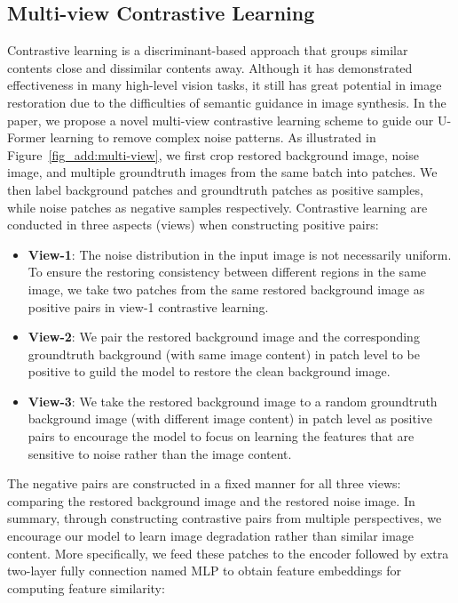 \subsection{Multi-view Contrastive Learning}
Contrastive learning is a discriminant-based approach that groups similar contents close and dissimilar contents away. Although it has demonstrated effectiveness in many high-level vision tasks, it still has great potential in image restoration due to the difficulties of semantic guidance in image synthesis. In the paper, we propose a novel multi-view contrastive learning scheme to guide our U-Former learning to remove complex noise patterns. As illustrated in Figure~\ref{fig_add:multi-view}, we first crop restored background image, noise image, and multiple groundtruth images from the same batch into patches. We then label background patches and groundtruth patches as positive samples, while noise patches as negative samples respectively. Contrastive learning are conducted in three aspects (views) when constructing positive pairs:
\begin{itemize}
    \item \textbf{View-1}: The noise distribution in the input image is not necessarily uniform. To ensure the restoring consistency between different regions in the same image, we take two patches from the same restored background image as positive pairs in view-1 contrastive learning.
    \item \textbf{View-2}: We pair the restored background image and the corresponding groundtruth background (with same image content) in patch level to be positive to guild the model to restore the clean background image.
    \item  \textbf{View-3}: We take the restored background image to a random groundtruth background image (with different image content) in patch level as positive pairs to encourage the model to focus on learning the features that are sensitive to noise rather than the image content.
\end{itemize}
The negative pairs are constructed in a fixed manner for all three views: comparing the restored background image and the restored noise image. In summary, through constructing contrastive pairs from multiple perspectives, we encourage our model to learn image degradation rather than similar image content. More specifically, we feed these patches to the encoder followed by extra two-layer fully connection named MLP to obtain feature embeddings for computing feature similarity:

